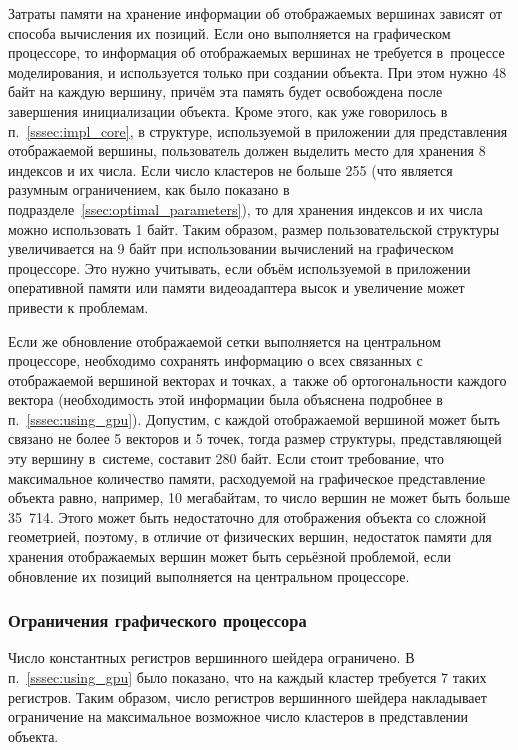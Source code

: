 \documentclass[a4paper, 14pt, titlepage]{extarticle}
\begin{document}
        Затраты памяти на хранение информации об отображаемых вершинах зависят от способа вычисления
        их позиций. Если оно выполняется на графическом процессоре, то информация об отображаемых
        вершинах не требуется в~процессе моделирования, и используется только при создании объекта.
        При этом нужно 48 байт на каждую вершину, причём эта память будет освобождена после
        завершения инициализации объекта. Кроме этого, как уже говорилось в п.~\ref{sssec:impl_core},
        в структуре, используемой в приложении для представления отображаемой вершины, пользователь
        должен выделить место для хранения 8 индексов и их числа.  Если число кластеров не больше
        255 (что является разумным ограничением, как было показано в подразделе~\ref{ssec:optimal_parameters}),
        то для хранения индексов и их числа можно использовать 1 байт. Таким образом,
        размер пользовательской структуры увеличивается на 9 байт при использовании вычислений на
        графическом процессоре. Это нужно учитывать, если объём используемой в приложении
        оперативной памяти или памяти видеоадаптера высок и увеличение может привести к проблемам.

        Если же обновление отображаемой сетки выполняется на центральном процессоре, необходимо
        сохранять информацию о всех связанных с отображаемой вершиной векторах и точках, а~также об
        ортогональности каждого вектора (необходимость этой информации была объяснена подробнее в
        п.~\ref{sssec:using_gpu}). Допустим, с каждой отображаемой вершиной может быть связано
        не более 5 векторов и 5 точек, тогда размер структуры, представляющей эту вершину в~системе,
        составит 280 байт. Если стоит требование, что максимальное количество памяти, расходуемой на
        графическое представление объекта равно, например, 10 мегабайтам, то число вершин не может
        быть больше 35~714. Этого может быть недостаточно для отображения объекта со сложной
        геометрией, поэтому, в отличие от физических вершин, недостаток памяти для хранения
        отображаемых вершин может быть серьёзной проблемой, если обновление их позиций выполняется
        на центральном процессоре.

      \subsubsection{Ограничения графического процессора}

        Число константных регистров вершинного шейдера ограничено. В п.~\ref{sssec:using_gpu} было
        показано, что на каждый кластер требуется 7 таких регистров. Таким образом, число регистров
        вершинного шейдера накладывает ограничение на максимальное возможное число кластеров в
        представлении объекта.
\end{document}
